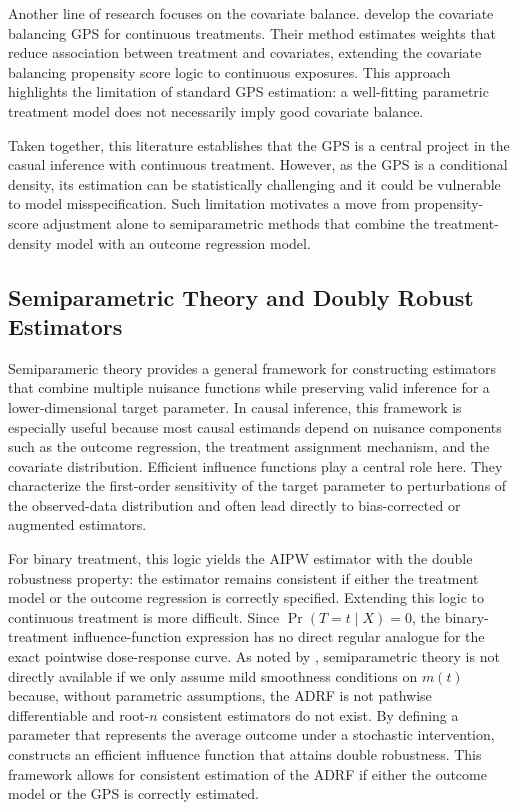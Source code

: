 \documentclass[12pt]{article}
\theoremstyle{definition}
\begin{document}
Another line of research focuses on the covariate balance. \citet{fong2018covariate} develop the covariate balancing GPS for continuous treatments. Their method estimates weights that reduce association between treatment and covariates, extending the covariate balancing propensity score logic to continuous exposures. This approach highlights the limitation of standard GPS estimation: a well-fitting parametric treatment model does not necessarily imply good covariate balance.

Taken together, this literature establishes that the GPS is a central project in the casual inference with continuous treatment. However, as the GPS is a conditional density, its estimation can be statistically challenging and it could be vulnerable to model misspecification. Such limitation motivates a move from propensity-score adjustment alone to semiparametric methods that combine the treatment-density model with an outcome regression model.

\subsection{Semiparametric Theory and Doubly Robust Estimators}

Semiparameric theory provides a general framework for constructing estimators that combine multiple nuisance functions while preserving valid inference for a lower-dimensional target parameter. In causal inference, this framework is especially useful because most causal estimands depend on nuisance components such as the outcome regression, the treatment assignment mechanism, and the covariate distribution. Efficient influence functions play a central role here. They characterize the first-order sensitivity of the target parameter to perturbations of the observed-data distribution and often lead directly to bias-corrected or augmented estimators.

For binary treatment, this logic yields the AIPW estimator with the double robustness property: the estimator remains consistent if either the treatment model or the outcome regression is correctly specified. Extending this logic to continuous treatment is more difficult. Since $\Pr \left( T = t \mid X \right) = 0$, the binary-treatment influence-function expression has no direct regular analogue for the exact pointwise dose-response curve. As noted by \citet{Kennedy2017a}, semiparametric theory is not directly available if we only assume mild smoothness conditions on $m(t)$ because, without parametric assumptions, the ADRF is not pathwise differentiable and root-$n$ consistent estimators do not exist. By defining a parameter that represents the average outcome under a stochastic intervention, \citet{Kennedy2017a} constructs an efficient influence function that attains double robustness. This framework allows for consistent estimation of the ADRF if either the outcome model or the GPS is correctly estimated. 
\end{document}
